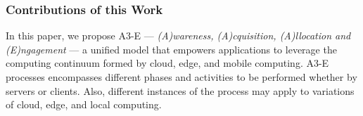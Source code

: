 

%


\subsubsection*{Contributions of this Work}


In this paper, we propose A3-E --- \textit{(A)wareness, (A)cquisition, (A)llocation and (E)ngagement} --- a unified model that empowers applications to leverage the computing continuum formed by cloud, edge, and mobile computing. A3-E processes encompasses different phases and activities to be performed whether by servers or clients. Also, different instances of the process may apply to variations of cloud, edge, and local computing.


